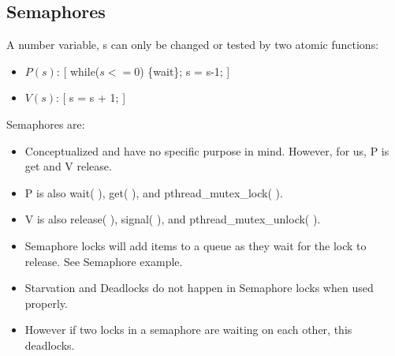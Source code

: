 \documentclass[fontsize=5pt]{scrartcl}
\begin{document}
\begin{multicols}{3}
\begin{itemize}
       \end{itemize}
       \subsection{Semaphores}
         A  number variable, s can only be changed or tested by two atomic functions:
         \begin{itemize}
          \item $P(s)$: [ while($s<=0$) \{wait\}; s = s-1; ]
          \item $V(s)$: [ s = s + 1; ]
         \end{itemize}
         Semaphores are:
         \begin{itemize}
          \item Conceptualized and have no specific purpose in mind. However, for us, P is get and
                V release.
          \item P is also wait( ), get( ), and pthread\_mutex\_lock( ).
          \item V is also release( ), signal( ), and pthread\_mutex\_unlock( ).
          \item Semaphore locks will add items to a queue as they wait for the lock to release. See Semaphore example.
          \item Starvation and Deadlocks do not happen in Semaphore locks when used properly.
          \item However if two locks in a semaphore are waiting on each other, this deadlocks.
        \end{itemize}
        


\end{multicols}
\end{document}
